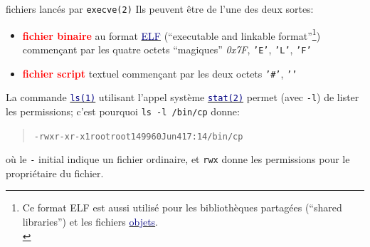 \documentclass[lualatex,11pt,a4paper,svgnames,french]{beamer}
\newcommand{\clbhref}[2]{{\href{https:#1}{{\textcolor{Navy}{#2}}}}}
\newcommand{\clbman}[2]{{\href{https://https://man7.org/linux/man-pages/#1.html}{{\textcolor{Navy}{\texttt{#2}}}}}}
\newcommand{\clbrougras}[1]{{\textcolor{Red}{\textbf{#1}}}}
\begin{document}
\begin{frame}{fichiers lancés par \texttt{execve(2)}}
  Ils peuvent être de l'une des deux sortes:
  \begin{itemize}
  \item \clbrougras{fichier binaire} au format
    \clbhref{fr.wikipedia.org/wiki/Executable_and_Linkable_Format}{ELF}
    (``executable and linkable format''\footnote{Ce format ELF est
    aussi utilisé pour les bibliothèques partagées (``shared
    libraries'') et les fichiers 
    \clbhref{fr.wikipedia.org/wiki/Fichier_objet}{objets}.\\})
    commençant par les quatre
    octets ``magiques'' \textit{0x7F}, \texttt{'E'}, \texttt{'L'}, \texttt{'F'}
  \item \clbrougras{fichier script} textuel commençant par les deux
    octets \texttt{'\#'}, \texttt{'\!'}
  \end{itemize}

  \bigskip
  
  La commande
  \clbman{man1/ls.1}{ls(1)} utilisant l'appel système
  \clbman{man2/stat.2}{stat(2)}  permet (avec \texttt{-l}) de lister les permissions; c'est pourquoi \texttt{ls -l /bin/cp} donne:
  \begin{quote}
  \begin{alltt}      
-rwxr-xr-x 1 root root 149960 Jun  4 17:14 /bin/cp
  \end{alltt}
  \end{quote}
  où le \texttt{-} initial indique un fichier ordinaire, et \texttt{rwx} donne les permissions pour le propriétaire du fichier.
  
\end{frame}
\end{document}
